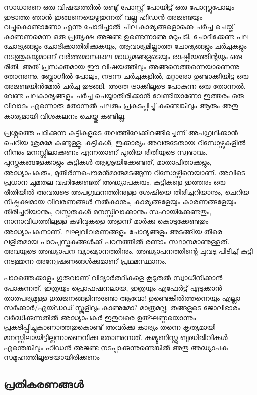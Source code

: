 \vskip 2pt

സാധാരണ ഒരു വിഷയത്തില്‍ രണ്ടു് പോസ്റ്റ് പോയിട്ട് ഒരു പോസ്റ്റുപോലും ഇടാത്ത ഞാന്‍ ഇങ്ങനെയെഴുതുന്നത്
വല്ല ഹിഡന്‍ അജണ്ടയും വച്ചുകൊണ്ടാണോ എന്നു ചോദിച്ചാല്‍ ചില കാര്യങ്ങളൊക്കെ ചര്‍ച്ച ചെയ്ത് കാണണമെന്ന 
ഒരു പ്രത്യക്ഷ അജണ്ട ഉണ്ടെന്നാണു മറുപടി. ചോദിക്കേണ്ട പല ചോദ്യങ്ങളും ചോദിക്കാതിരിക്കുകയും, ആവശ്യമില്ലാത്ത 
ചോദ്യങ്ങളും ചര്‍ച്ചകളും നടത്തുകയുമാണ് വര്‍ത്തമാനകാല മാധ്യമങ്ങളുടെയും രാഷ്ട്രീയത്തിന്റയും ഒരു രീതി. അത് 
പ്രസക്തമായ ഈ വിഷയത്തിലും അങ്ങനെത്തന്നെയാണെന്നു തോന്നുന്നു. ബ്ലോഗില്‍ പോലും, നടന്ന ചര്‍ച്ചകളില്‍, 
മറ്റാരോ ഉണ്ടാക്കിയിട്ട ഒരു അജണ്ടയിന്‍മേല്‍ ചര്‍ച്ച തുടങ്ങി, അതേ ട്രാക്കിലൂടെ പോകുന്ന ഒരു തോന്നല്‍. വേണ്ട 
പലകാര്യങ്ങളും ചര്‍ച്ച ചെയ്യാതിരിക്കാന്‍ വേണ്ടിയാണോ ഇത്തരം ഒരു വിവാദം എന്നൊരു തോന്നല്‍ പലരും 
പ്രകടപ്പിച്ചു് കണ്ടെങ്കിലും ആരും അതു കാര്യമായി വിശകലനം ചെയ്തു കണ്ടില്ല.

പ്രശ്നത്തെ പഠിക്കുന്ന കുട്ടികളുടെ തലത്തിലേക്കിറങ്ങിച്ചെന്ന് അപഗ്രഥിക്കാന്‍ ചെറിയ ശ്രമമേ കണ്ടുള്ളൂ. കുട്ടികള്‍, 
ഇക്കാര്യം അവരുടേതായ റിസോഴ്സുകളില്‍ നിന്നും മനസ്സിലാക്കണം എന്നതാണ് പുതിയ രീതിയുടെ സ്വഭാവം. 
പുസ്തകങ്ങളേക്കാളും കുട്ടികള്‍ ആശ്രയിക്കേണ്ടത്, മാതാപിതാക്കളും, അദ്ധ്യാപകരും, മുതിര്‍ന്നപൌരന്‍മാരുമടങ്ങുന്ന 
റിസോഴ്സിനെയാണ്. അവിടെ പ്രധാന ചുമതല വഹിക്കേണ്ടത് അദ്ധ്യാപകരും. കുട്ടികളെ ഇത്തരം ഒരു രീതിയില്‍ 
അവരുടെ അപഗ്രഥനത്തിനുള്ള ശേഷിയെ തിരിച്ചറിയാനും, ചെറിയ നിഷ്പക്ഷമായ വിവരണങ്ങള്‍ നല്‍കാനും, 
കാര്യങ്ങളേയും കാരണങ്ങളേയും തിരിച്ചറിയാനും, വസ്തുതകള്‍ മനസ്സിലാക്കാനും സഹായിക്കേണ്ടതും, നാനാവിധത്തിലുള്ള 
കഴിവുകളെ അളന്ന് മാര്‍ക്കു കൊടുക്കേണ്ടതും അദ്ധ്യാപകനാണ്. ലഘുവിവരണങ്ങളും ചോദ്യങ്ങളും അടങ്ങിയ തീരെ 
ലളിതമായ പാഠപുസ്തകങ്ങള്‍ക്ക് പഠനത്തില്‍ രണ്ടാം സ്ഥാനമാണുള്ളത്. അവയുടെ അദ്ധ്യാപന വ്യാഖ്യാനത്തിനും, 
അദ്ധ്യാപനത്തിന്റെ ചുവടു പിടിച്ച് കുട്ടി നടത്തുന്ന അന്വേഷണങ്ങള്‍ക്കുമാണ് പ്രഥമസ്ഥാനം.

പാഠത്തെക്കാളും ഗുരുവാണ് വിദ്യാര്‍ത്ഥികളെ കൂടുതല്‍ സ്വാധീനിക്കാന്‍ പോകുന്നത്. ഇത്രയും പ്രൊഫഷനലായ, 
ഇത്രയും എഫേര്‍ട്ട് എടുക്കാന്‍ താത്പര്യമുള്ള ഗുരുജനങ്ങളിന്നുണ്ടോ ആവോ! ഉണ്ടെങ്കില്‍ത്തന്നെയും എല്ലാ 
സര്‍ക്കാര്‍/എയ്ഡഡ് സ്കൂളിലും കാണുമോ? മാത്രമല്ല, തങ്ങളുടെ ജോലിഭാരം വര്‍ദ്ധിക്കുന്നതില്‍ അദ്ധ്യാപകര്‍ 
ഇതുവരെ ഉത്ഘണ്ഠയൊന്നും പ്രകടിപ്പിച്ചുകാണാത്തതുകൊണ്ട് അവര്‍ക്കു കാര്യം തന്നെ കൃത്യമായി 
മനസ്സിലായിട്ടില്ലന്നാണെനിക്കു തോന്നുന്നത്. കമ്യൂണിസ്റ്റു ബുദ്ധിജീവികള്‍ എന്തെങ്കിലും ഹിഡന്‍ അജണ്ട 
നടപ്പാക്കുന്നുണ്ടെങ്കില്‍ അതു അദ്ധ്യാപക സമൂഹത്തിലൂടെയായിരിക്കണം

\subsection*{പ്രതികരണങ്ങള്‍}

